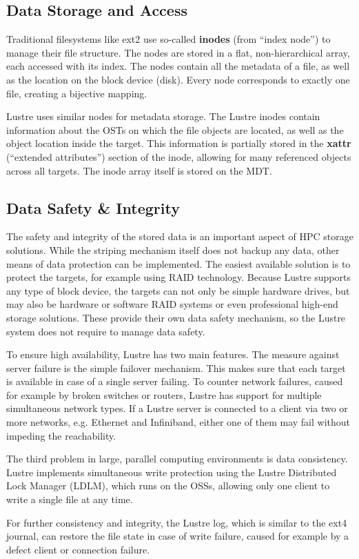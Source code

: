 \newpage
\subsection{Data Storage and Access}

Traditional filesystems like ext2 use so-called \textbf{inodes} (from
``index node'') to manage their file structure. The nodes are stored in a flat,
non-hierarchical array, each accessed with its index. The nodes contain all the
metadata of a file, as well as the location on the block device (disk). Every
node corresponds to exactly one file, creating a bijective mapping.

Lustre uses similar nodes for metadata storage. The Lustre inodes contain
information about the OSTs on which the file objects are located, as well as
the object location inside the target. This information is partially stored in
the \textbf{xattr} (``extended attributes'') section of the inode, allowing for
many referenced objects across all targets. The inode array itself is stored
on the MDT.

\subsection{Data Safety \& Integrity}

The safety and integrity of the stored data is an important aspect of HPC storage
solutions. While the striping mechanism itself does not backup any data, other
means of data protection can be implemented. The easiest available solution is
to protect the targets, for example using RAID technology. Because Lustre supports
any type of block device, the targets can not only be simple hardware drives,
but may also be hardware or software RAID systems or even professional high-end
storage solutions. These provide their own data safety mechanism, so the Lustre
system does not require to manage data safety.

To ensure high availability, Lustre has two main features. The measure against
server failure is the simple failover mechanism. This makes sure that each
target is available in case of a single server failing. To counter network failures,
caused for example by broken switches or routers, Lustre has support for multiple
simultaneous network types. If a Lustre server is connected to a client via two
or more networks, e.g. Ethernet and Infiniband, either one of them may fail
without impeding the reachability.

The third problem in large, parallel computing environments is data consistency.
Lustre implements simultaneous write protection using the Lustre Distributed Lock
Manager (LDLM), which runs on the OSSs, allowing only one client to write a
single file at any time.

For further consistency and integrity, the Lustre log, which is similar to the
ext4 journal, can restore the file state in case of write failure, caused for
example by a defect client or connection failure.
